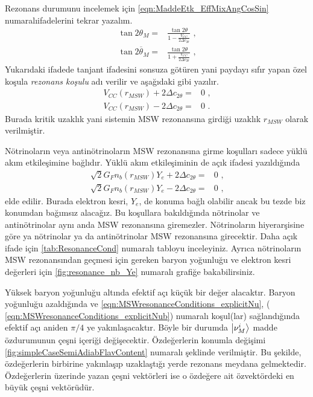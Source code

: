 Rezonans durumunu incelemek için \eqref{eqn:MaddeEtk_EffMixAngCosSin} numaralıifadelerini tekrar yazalım.
\begin{align}
	\tan 2\theta_{M} =& \frac{\tan 2\theta}{1- \frac{V_{CC}}{2\Delta c_{2\theta}}} \text{ ,} \\
	\tan 2\overline{\theta}_{M} =& \frac{\tan 2\theta}{1+ \frac{V_{CC}}{2\Delta c_{2\theta}}} \text{ ,}
\end{align}
Yukarıdaki ifadede tanjant ifadesini sonsuza götüren yani paydayı sıfır yapan özel koşula \emph{rezonans koşulu} adı verilir ve aşağıdaki gibi yazılır.
\begin{align}\label{eqn:MSWresonanceConditions}
	V_{CC}(r_{MSW}) + 2\Delta c_{2\theta} =& 0 \text{ ,} \\
	V_{CC}(r_{MSW}) - 2\Delta c_{2\theta} =& 0 \text{ .}
\end{align}
Burada kritik uzaklık yani sistemin MSW rezonansına girdiği uzaklık $ r_{MSW} $ olarak verilmiştir.

Nötrinoların veya antinötrinoların MSW rezonansına girme koşulları sadece yüklü akım etkileşimine bağlıdır. Yüklü akım etkileşiminin de açık ifadesi yazıldığında
\begin{align} 
	\label{eqn:MSWresonanceConditions_explicitNu}\sqrt{2}G_{F}n_{b}(r_{MSW})Y_{e} + 2\Delta c_{2\theta} =& 0 \text{ ,} \\
	\label{eqn:MSWresonanceConditions_explicitNub}\sqrt{2}G_{F}n_{b}(r_{MSW})Y_{e} - 2\Delta c_{2\theta} =& 0 \text{ ,}
\end{align}
elde edilir. Burada elektron kesri, $ Y_{e} $, de konuma bağlı olabilir ancak bu tezde biz konumdan bağımsız alacağız. Bu koşullara bakıldığında nötrinolar ve antinötrinolar aynı anda MSW rezonansına giremezler. Nötrinoların hiyerarşisine göre ya nötrinolar ya da antinötrinolar MSW rezonansına girecektir. Daha açık ifade için \ref{tab:ResonanceCond} numaralı tabloyu inceleyiniz. Ayrıca nötrinoların MSW rezonansından geçmesi için gereken baryon yoğunluğu ve elektron kesri değerleri için \ref{fig:resonance_nb_Ye} numaralı grafiğe bakabilirsiniz.

Yüksek baryon yoğunluğu altında efektif açı küçük bir değer alacaktır. Baryon yoğunluğu azaldığında ve \eqref{eqn:MSWresonanceConditions_explicitNu}, ( \eqref{eqn:MSWresonanceConditions_explicitNub}) numaralı koşul(lar) sağlandığında efektif açı aniden $ \pi/4 $ ye yakınlaşacaktır. Böyle bir durumda $ \ket{\nu^{i}_{M}} $ madde özdurumunun çeşni içeriği değişecektir. Özdeğerlerin konumla değişimi \ref{fig:simpleCaseSemiAdiabFlavContent} numaralı şeklinde verilmiştir. Bu şekilde, özdeğerlerin birbirine yakınlaşıp uzaklaştığı yerde rezonans meydana gelmektedir. Özdeğerlerin üzerinde yazan çeşni vektörleri ise o özdeğere ait özvektördeki en büyük çeşni vektörüdür.

